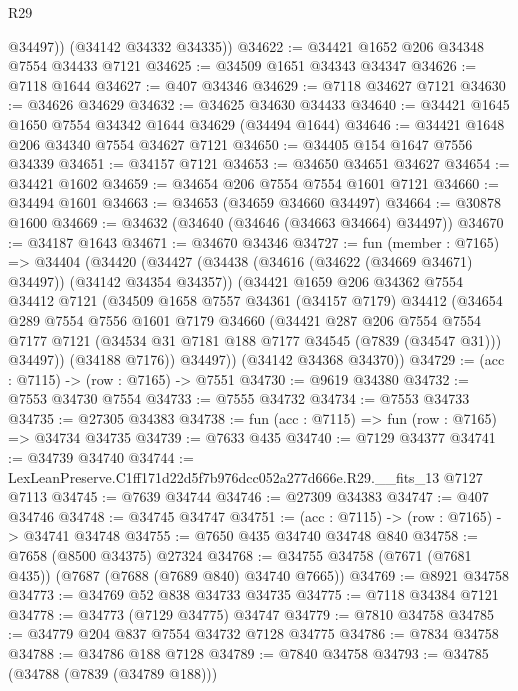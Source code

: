 \begin{lexlean}{R29}
\begin{coremodule}
          @34497))
      (@34142 @34332 @34335))
@34622 := @34421 @1652 @206 @34348 @7554 @34433 @7121
@34625 := @34509 @1651 @34343 @34347
@34626 := @7118 @1644
@34627 := @407 @34346
@34629 := @7118 @34627 @7121
@34630 := @34626 @34629
@34632 := @34625 @34630 @34433
@34640 := @34421 @1645 @1650 @7554 @34342 @1644 @34629 (@34494 @1644)
@34646 := @34421 @1648 @206 @34340 @7554 @34627 @7121
@34650 := @34405 @154 @1647 @7556 @34339
@34651 := @34157 @7121
@34653 := @34650 @34651 @34627
@34654 := @34421 @1602
@34659 := @34654 @206 @7554 @7554 @1601 @7121
@34660 := @34494 @1601
@34663 := @34653 (@34659 @34660 @34497)
@34664 := @30878 @1600
@34669 := @34632 (@34640 (@34646 (@34663 @34664) @34497))
@34670 := @34187 @1643
@34671 := @34670 @34346
@34727 := fun (member : @7165) =>
  @34404
    (@34420
      (@34427
        (@34438 (@34616 (@34622 (@34669 @34671) @34497)) (@34142 @34354 @34357))
        (@34421
          @1659
          @206
          @34362
          @7554
          @34412
          @7121
          (@34509
            @1658
            @7557
            @34361
            (@34157 @7179)
            @34412
            (@34654
              @289
              @7554
              @7556
              @1601
              @7179
              @34660
              (@34421
                @287
                @206
                @7554
                @7554
                @7177
                @7121
                (@34534 @31 @7181 @188 @7177 @34545 (@7839 (@34547 @31)))
                @34497))
            (@34188 @7176))
          @34497))
      (@34142 @34368 @34370))
@34729 := (acc : @7115) -> (row : @7165) -> @7551
@34730 := @9619 @34380
@34732 := @7553 @34730 @7554
@34733 := @7555 @34732
@34734 := @7553 @34733
@34735 := @27305 @34383
@34738 := fun (acc : @7115) => fun (row : @7165) => @34734 @34735
@34739 := @7633 @435
@34740 := @7129 @34377
@34741 := @34739 @34740
@34744 := LexLeanPreserve.C1ff171d22d5f7b976dcc052a277d666e.R29.__fits_13 @7127 @7113
@34745 := @7639 @34744
@34746 := @27309 @34383
@34747 := @407 @34746
@34748 := @34745 @34747
@34751 := (acc : @7115) -> (row : @7165) -> @34741 @34748
@34755 := @7650 @435 @34740 @34748 @840
@34758 := @7658 (@8500 @34375) @27324
@34768 := @34755 @34758 (@7671 (@7681 @435)) (@7687 (@7688 (@7689 @840) @34740 @7665))
@34769 := @8921 @34758
@34773 := @34769 @52 @838 @34733 @34735
@34775 := @7118 @34384 @7121
@34778 := @34773 (@7129 @34775) @34747
@34779 := @7810 @34758
@34785 := @34779 @204 @837 @7554 @34732 @7128 @34775
@34786 := @7834 @34758
@34788 := @34786 @188 @7128
@34789 := @7840 @34758
@34793 := @34785 (@34788 (@7839 (@34789 @188)))

\end{coremodule}
\end{lexlean}
